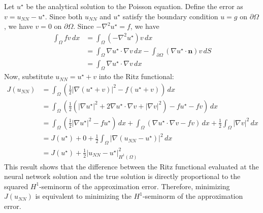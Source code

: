 \documentclass{article}
\begin{document}
Let $u^\star$ be the analytical solution to the Poisson equation. Define the error as $v = u_{NN} - u^\star$. Since both $u_{NN}$ and $u^\star$ satisfy the boundary condition $u=g$ on $\partial\Omega$, we have $v=0$ on $\partial\Omega$.
Since $-\nabla^2 u^\star = f$, we have
\begin{align*}
\int_{\Omega} f v \, dx &= \int_{\Omega} (-\nabla^2 u^\star) v \, dx \\
&= \int_{\Omega} \nabla u^\star \cdot \nabla v \, dx - \int_{\partial\Omega} (\nabla u^\star \cdot \mathbf{n}) v \, dS \\
&= \int_{\Omega} \nabla u^\star \cdot \nabla v \, dx
\end{align*}
Now, substitute $u_{NN} = u^\star + v$ into the Ritz functional:
\begin{align*}
J(u_{NN}) &= \int_{\Omega} \left( \frac{1}{2} |\nabla (u^\star + v)|^2 - f (u^\star + v) \right) \, dx \\
&= \int_{\Omega} \left( \frac{1}{2} (|\nabla u^\star|^2 + 2 \nabla u^\star \cdot \nabla v + |\nabla v|^2) - f u^\star - f v \right) \, dx \\
&= \int_{\Omega} \left( \frac{1}{2} |\nabla u^\star|^2 - f u^\star \right) \, dx + \int_{\Omega} \left( \nabla u^\star \cdot \nabla v - f v \right) \, dx + \frac{1}{2} \int_{\Omega} |\nabla v|^2 \, dx \\
&= J(u^\star) + 0 + \frac{1}{2} \int_{\Omega} |\nabla (u_{NN} - u^\star)|^2 \, dx \\
&= J(u^\star) + \frac{1}{2} \vert u_{NN} - u^\star\vert_{H^1(\Omega)}^2
\end{align*}
This result shows that the difference between the Ritz functional evaluated at the neural network solution and the true solution is directly proportional to the squared $H^1$-seminorm of the approximation error. Therefore, minimizing $J(u_{NN})$ is equivalent to minimizing the $H^1$-seminorm of the approximation error.
\end{document}
